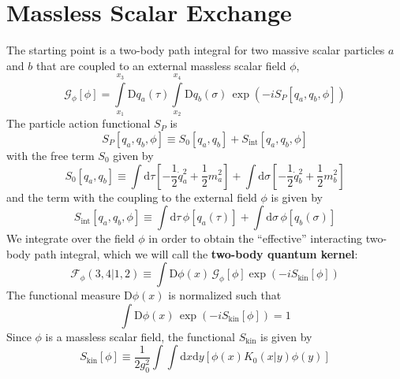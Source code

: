 \section{Massless Scalar Exchange\label{SecMasslessSca4}}
The starting point is a two-body path integral for two massive scalar particles $a$ and $b$ that are coupled to an external massless scalar field $\phi$,
\begin{equation}
	\mathcal{G}_{\phi}[\phi] = \int\limits_{x_{1}}^{x_{3}} \mathrm{D}q_{a}(\tau) \int\limits_{x_{2}}^{x_{4}} \mathrm{D}q_{b}(\sigma) \, \exp{\left(- i S_{P}[q_{a}, q_{b}, \phi] \right)}
\end{equation}
The particle action functional $S_{P}$ is
\begin{equation}
	S_{P}[q_{a}, q_{b}, \phi] \equiv S_{0}[q_{a}, q_{b}] + S_{\text{int}}[q_{a}, q_{b}, \phi]
\end{equation}
with the free term $S_{0}$ given by
\begin{equation}
	S_{0}\left[q_{a}, q_{b} \right] \equiv \int \mathrm{d}\tau \left[- \frac{1}{2} \dot{q}_{a}^{2} + \frac{1}{2} m^{2}_{a} \right] + \int \mathrm{d}\sigma \left[- \frac{1}{2} \dot{q}_{b}^{2} + \frac{1}{2} m^{2}_{b} \right] \label{FreeS}
\end{equation}
and the term with the coupling to the external field $\phi$ is given by
\begin{equation}
	S_{\text{int}}[q_{a}, q_{b}, \phi] \equiv \int \mathrm{d}\tau \, \phi[q_{a}(\tau)] + \int \mathrm{d}\sigma \, \phi[q_{b}(\sigma)] \label{SintSca}
\end{equation}
We integrate over the field $\phi$ in order to obtain the ``effective'' interacting two-body path integral, which we will call the \textbf{two-body quantum kernel}:
\begin{equation}
	\mathcal{F}_{\phi}(3,4|1,2) \equiv \int \mathrm{D}\phi(x) \, \mathcal{G}_{\phi}[\phi] \exp{\left( -i S_{\text{kin}}[\phi] \right)}
\end{equation}
The functional measure $\mathrm{D}\phi(x)$ is normalized such that
\begin{equation}
	\int \mathrm{D}\phi(x) \, \exp{\left( -i S_{\text{kin}}[\phi] \right)} = 1
\end{equation}
Since $\phi$ is a massless scalar field, the functional $S_{\text{kin}}$ is given by
\begin{equation}
	S_{\text{kin}}[\phi] \equiv \frac{1}{2g_{0}^{2}} \int \int \mathrm{d}x \mathrm{d}y \left[ \phi(x) K_{0}(x | y) \phi(y) \right] \label{SkinSca}
\end{equation}
